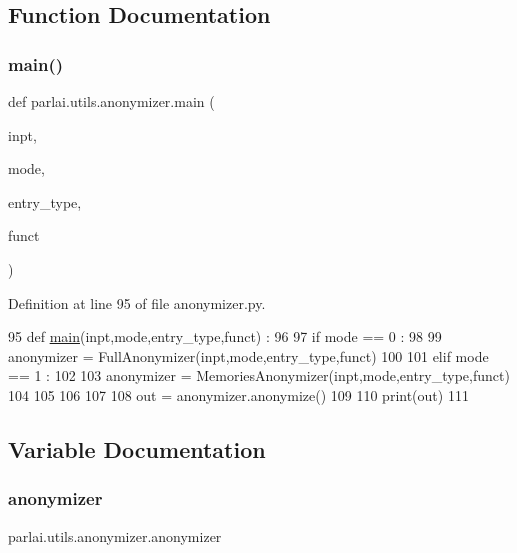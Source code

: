 \subsection{Function Documentation}
\mbox{\label{namespaceparlai_1_1utils_1_1anonymizer_a388eedb16f0bdab16de2cdf114c81ed3}} 
\subsubsection{\texorpdfstring{main()}{main()}}
{\footnotesize\ttfamily def parlai.\+utils.\+anonymizer.\+main (\begin{DoxyParamCaption}\item[{}]{inpt,  }\item[{}]{mode,  }\item[{}]{entry\+\_\+type,  }\item[{}]{funct }\end{DoxyParamCaption})}



Definition at line 95 of file anonymizer.\+py.


\begin{DoxyCode}
95 \textcolor{keyword}{def }\hyperlink{namespaceparlai_1_1utils_1_1anonymizer_a388eedb16f0bdab16de2cdf114c81ed3}{main}(inpt,mode,entry\_type,funct) : 
96 
97     \textcolor{keywordflow}{if} mode == 0 : 
98 
99         anonymizer = FullAnonymizer(inpt,mode,entry\_type,funct)
100 
101     \textcolor{keywordflow}{elif} mode == 1 : 
102 
103         anonymizer = MemoriesAnonymizer(inpt,mode,entry\_type,funct) 
104 
105 
106 
107 
108     out = anonymizer.anonymize()
109 
110     print(out) 
111 
\end{DoxyCode}


\subsection{Variable Documentation}
\mbox{\label{namespaceparlai_1_1utils_1_1anonymizer_a7ebd07808048c2e238fe70c539aff744}} 
\subsubsection{\texorpdfstring{anonymizer}{anonymizer}}
{\footnotesize\ttfamily parlai.\+utils.\+anonymizer.\+anonymizer}



